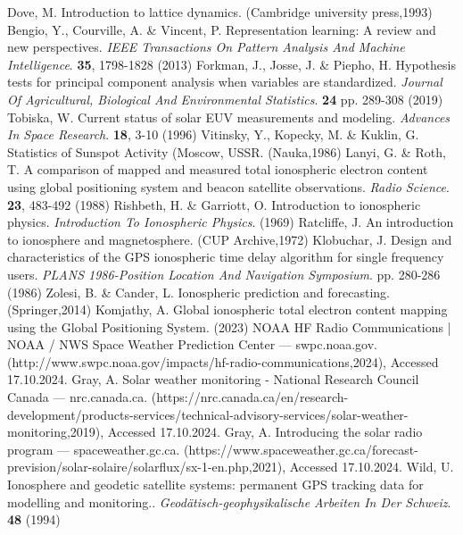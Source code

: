 \documentclass[sn-mathphys-num]{sn-jnl}%
\begin{document}
\begin{thebibliography}{000}
Dove, M. Introduction to lattice dynamics. (Cambridge university press,1993)
Bengio, Y., Courville, A. \& Vincent, P. Representation learning: A review and new perspectives. {\em IEEE Transactions On Pattern Analysis And Machine Intelligence}. \textbf{35}, 1798-1828 (2013)
Forkman, J., Josse, J. \& Piepho, H. Hypothesis tests for principal component analysis when variables are standardized. {\em Journal Of Agricultural, Biological And Environmental Statistics}. \textbf{24} pp. 289-308 (2019)
Tobiska, W. Current status of solar EUV measurements and modeling. {\em Advances In Space Research}. \textbf{18}, 3-10 (1996)
Vitinsky, Y., Kopecky, M. \& Kuklin, G. Statistics of Sunspot Activity (Moscow, USSR. (Nauka,1986)
Lanyi, G. \& Roth, T. A comparison of mapped and measured total ionospheric electron content using global positioning system and beacon satellite observations. {\em Radio Science}. \textbf{23}, 483-492 (1988)
Rishbeth, H. \& Garriott, O. Introduction to ionospheric physics. {\em Introduction To Ionospheric Physics}. (1969)
Ratcliffe, J. An introduction to ionosphere and magnetosphere. (CUP Archive,1972)
Klobuchar, J. Design and characteristics of the GPS ionospheric time delay algorithm for single frequency users. {\em PLANS 1986-Position Location And Navigation Symposium}. pp. 280-286 (1986)
Zolesi, B. \& Cander, L. Ionospheric prediction and forecasting. (Springer,2014)
Komjathy, A. Global ionospheric total electron content mapping using the Global Positioning System.  (2023)
NOAA HF Radio Communications | NOAA / NWS Space Weather Prediction Center — swpc.noaa.gov. (http://www.swpc.noaa.gov/impacts/hf-radio-communications,2024), Accessed 17.10.2024.
Gray, A. Solar weather monitoring - National Research Council Canada — nrc.canada.ca. (https://nrc.canada.ca/en/research-development/products-services/technical-advisory-services/solar-weather-monitoring,2019), Accessed 17.10.2024.
Gray, A. Introducing the solar radio program — spaceweather.gc.ca. (https://www.spaceweather.gc.ca/forecast-prevision/solar-solaire/solarflux/sx-1-en.php,2021), Accessed 17.10.2024.
Wild, U. Ionosphere and geodetic satellite systems: permanent GPS tracking data for modelling and monitoring.. {\em Geodätisch-geophysikalische Arbeiten In Der Schweiz}. \textbf{48} (1994)

\end{thebibliography}
\end{document}
